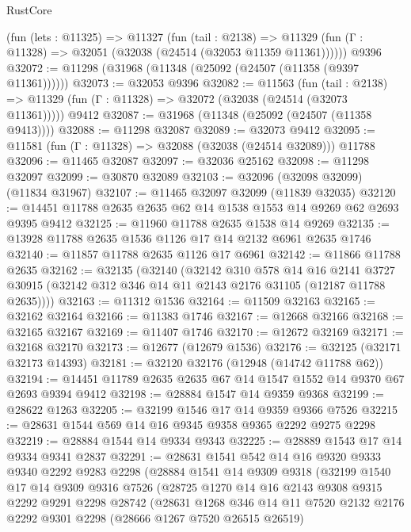 \begin{lexlean}{RustCore}
\begin{coremodule}
    (fun (lets : @11325) =>
    @11327
      (fun (tail : @2138) =>
      @11329 (fun (Γ : @11328) => @32051 (@32038 (@24514 (@32053 @11359 @11361))))))
    @9396
@32072 := @11298 (@31968 (@11348 (@25092 (@24507 (@11358 (@9397 @11361))))))
@32073 := @32053 @9396
@32082 := @11563
    (fun (tail : @2138) => @11329 (fun (Γ : @11328) => @32072 (@32038 (@24514 (@32073 @11361)))))
    @9412
@32087 := @31968 (@11348 (@25092 (@24507 (@11358 @9413))))
@32088 := @11298 @32087
@32089 := @32073 @9412
@32095 := @11581 (fun (Γ : @11328) => @32088 (@32038 (@24514 @32089))) @11788
@32096 := @11465 @32087
@32097 := @32036 @25162
@32098 := @11298 @32097
@32099 := @30870 @32089
@32103 := @32096 (@32098 @32099) (@11834 @31967)
@32107 := @11465 @32097 @32099 (@11839 @32035)
@32120 := @14451 @11788 @2635 @2635 @62 @14 @1538 @1553 @14 @9269 @62 @2693 @9395 @9412
@32125 := @11960 @11788 @2635 @1538 @14 @9269
@32135 := @13928 @11788 @2635 @1536 @1126 @17 @14 @2132 @6961 @2635 @1746
@32140 := @11857 @11788 @2635 @1126 @17 @6961
@32142 := @11866 @11788 @2635
@32162 := @32135
    (@32140
      (@32142
        @310
        @578
        @14
        @16
        @2141
        @3727
        @30915
        (@32142 @312 @346 @14 @11 @2143 @2176 @31105 (@12187 @11788 @2635))))
@32163 := @11312 @1536
@32164 := @11509 @32163
@32165 := @32162 @32164
@32166 := @11383 @1746
@32167 := @12668 @32166
@32168 := @32165 @32167
@32169 := @11407 @1746
@32170 := @12672 @32169
@32171 := @32168 @32170
@32173 := @12677 (@12679 @1536)
@32176 := @32125 (@32171 @32173 @14393)
@32181 := @32120 @32176 (@12948 (@14742 @11788 @62))
@32194 := @14451 @11789 @2635 @2635 @67 @14 @1547 @1552 @14 @9370 @67 @2693 @9394 @9412
@32198 := @28884 @1547 @14 @9359 @9368
@32199 := @28622 @1263
@32205 := @32199 @1546 @17 @14 @9359 @9366 @7526
@32215 := @28631 @1544 @569 @14 @16 @9345 @9358 @9365 @2292 @9275 @2298
@32219 := @28884 @1544 @14 @9334 @9343
@32225 := @28889 @1543 @17 @14 @9334 @9341 @2837
@32291 := @28631
    @1541
    @542
    @14
    @16
    @9320
    @9333
    @9340
    @2292
    @9283
    @2298
    (@28884
      @1541
      @14
      @9309
      @9318
      (@32199
        @1540
        @17
        @14
        @9309
        @9316
        @7526
        (@28725
          @1270
          @14
          @16
          @2143
          @9308
          @9315
          @2292
          @9291
          @2298
          @28742
          (@28631
            @1268
            @346
            @14
            @11
            @7520
            @2132
            @2176
            @2292
            @9301
            @2298
            (@28666 @1267 @7520 @26515 @26519)

\end{coremodule}
\end{lexlean}
